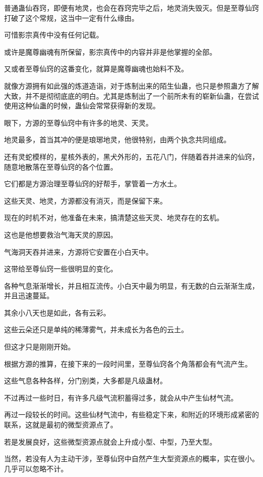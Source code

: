 \begin{this_body}
普通蛊仙吞窍，即便有地灵，也会在吞窍完毕之后，地灵消失毁灭。但是至尊仙窍打破了这个常规，这当中一定有什么缘由。

可惜影宗真传中没有任何记载。

或许是魔尊幽魂有所保留，影宗真传中的内容并非是他掌握的全部。

又或者至尊仙窍的这番变化，就算是魔尊幽魂也始料不及。

就像方源拥有如此强的炼道造诣，对于炼制出来的陌生仙蛊，也只是参照蛊方了解大致，并不是彻彻底底的明白。尤其是炼制出了一个前所未有的崭新仙蛊，在尝试使用这种仙蛊的时候，蛊仙会常常获得新的发现。

眼下，方源的至尊仙窍中有许多的地灵、天灵。

地灵最多，首当其冲的便是琅琊地灵，他很特别，由两个执念共同组成。

还有灵蛇模样的，星核外表的，黑犬外形的，五花八门，伴随着吞并进来的仙窍，随意地散落在至尊仙窍的各个位置。

它们都是方源治理至尊仙窍的好帮手，掌管着一方水土。

这些天灵、地灵，方源都没有消灭，而是保留下来。

现在的时机不对，他准备在未来，搞清楚这些天灵、地灵存在的玄机。

这也是他想要救治气海天灵的原因。

气海洞天吞并进来，方源将它安置在小白天中。

这带给至尊仙窍一些很明显的变化。

各种气息渐渐增长，并且相互流传。小白天中最为明显，有无数的白云渐渐生成，并且迅速蔓延。

其余小八天也是如此，各有云彩。

这些云朵还只是单纯的稀薄雾气，并未成长为各色的云土。

但这才只是刚刚开始。

根据方源的推算，在接下来的一段时间里，至尊仙窍各个角落都会有气流产生。

这些气息各种各样，分门别类，大多都是凡级蛊材。

不过再过一些时日，有许多凡级气流积蓄得过多，就会从中产生仙材气流。

再过一段较长的时间。这些仙材气流中，有些稳定下来，和附近的环境形成紧密的联系，这就是最初的微型资源点了。

若是发展良好，这些微型资源点就会上升成小型、中型，乃至大型。

当然，若没有人为主动干涉，至尊仙窍中自然产生大型资源点的概率，实在很小。几乎可以忽略不计。


\end{this_body}
